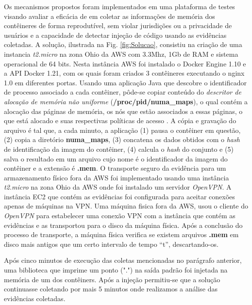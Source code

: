 %
Os mecanismos propostos foram implementados em uma plataforma de testes visando avaliar a eficácia de \fancyname em coletar as informações de memória dos contêineres de forma reprodutível, sem violar jurisdições ou a privacidade de usuários e a capacidade de detectar injeção de código usando as evidências coletadas.
%
A solução, ilustrada na Fig. \ref{fig:Solucao}, consistiu na criação de uma instancia \textit{t2.micro} na zona Ohio da AWS com 3.3Mhz, 1Gb de RAM e sistema operacional de 64 bits. 
%
Nesta instância AWS foi instalado o Docker Engine 1.10 e a API Docker 1.21, com os quais foram criados 3 contêineres executando o nginx 1.0 em diferentes portas. 
%
Usando uma aplicação Java que descobre o identificador de processo associado a cada contêiner, pôde-se copiar conteúdo do \textit{descritor de alocação de memória não uniforme} (\textbf{/proc/pid/numa\_maps}), o qual contém a alocação das páginas de memória, os nós que estão associados a essas páginas, o que está alocado e suas respectivas políticas de acesso \cite{UnixManPagesNumaMaps}.
%
A cópia e gravação do arquivo é tal que, a cada minuto, a aplicação (1) pausa o contêiner em questão, (2) copia a diretório \textbf{numa\_maps}, (3)  concatena os dados obtidos com o \textit{hash} de identificação da imagem do contêiner, (4) calcula o \textit{hash} do conjunto e (5) salva o resultado em um arquivo cujo nome é o identificador da imagem do contêiner e a extensão é \textbf{.mem}. 
%
O transporte seguro da evidência para um armazenamento físico fora da AWS foi implementado usando uma instância \textit{t2.micro} na zona Ohio da AWS onde foi instalado um servidor \textit{OpenVPN}.
%
A instância EC2 que contém as evidências foi configurada para aceitar conexões apenas de máquinas na VPN.
%
Uma máquina fisica fora da AWS, usou o cliente do \textit{OpenVPN} para estabelecer uma conexão VPN com a instância que contém as evidências e as transportou para o disco da máquina física.
%
Após a conclusão do processo de transporte, a máquina física verifica se existem arquivos \textbf{.mem} em disco mais antigos que um certo intervalo de tempo ``t'', descartando-os.
%


Após cinco minutos de execução das coletas mencionadas no parágrafo anterior, uma biblioteca que imprime um ponto (".") na saída padrão foi injetada na memória de um dos contêiners.
%
Após a injeção permitiu-se que a solução continuasse coletando por mais 5 minutos onde realizamos a análise das evidências coletadas.
%


